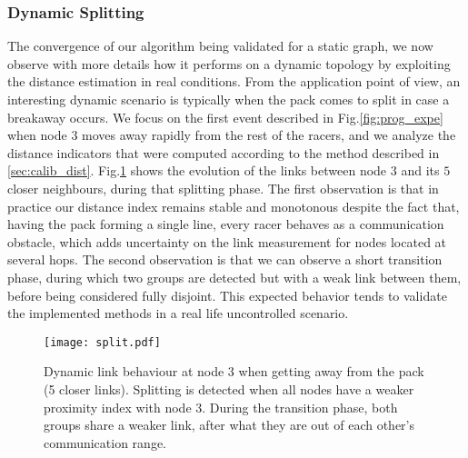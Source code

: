 \documentclass{sig-alternate}
\begin{document}
\subsubsection{Dynamic Splitting}
The convergence of our algorithm being validated for a static graph, we now observe with more details how it performs on a dynamic topology by exploiting the distance estimation in real conditions. From the application point of view, an interesting dynamic scenario is typically when the pack comes to split in case a breakaway occurs.
We focus on the first event described in Fig.\ref{fig:prog_expe} when node $3$ moves away rapidly from the rest of the racers, and we analyze the distance indicators that were computed according to the method described in \ref{sec:calib_dist}. Fig.\ref{fig:split} shows the evolution of the links between node $3$ and its $5$ closer neighbours, during that splitting phase.
The first observation is that in practice our distance index
remains stable and monotonous despite the fact that,  having the pack forming a single line, every racer behaves as a communication obstacle,
which adds uncertainty on the link measurement for nodes
located at several hops.
The second observation is that we can observe a short transition phase, during which two groups are detected but with a weak link between them, before being considered fully disjoint. This expected behavior tends to validate the implemented methods in a real life uncontrolled scenario.

\begin{figure}[t]
\centering
\texttt{[image: split.pdf]}
\caption{Dynamic link behaviour at node 3 when getting away from the pack (5 closer links). Splitting is detected when all nodes have a weaker proximity index with node 3. During the transition phase, both groups share a weaker link, after what they are out of each other's communication range.}
\label{fig:split}
\end{figure}
\end{document}
